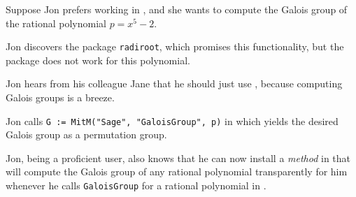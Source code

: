Suppose Jon prefers working in \GAP, and she wants to compute the
Galois group of the rational polynomial $p = x^5 - 2$.

Jon discovers the \GAP package \texttt{radiroot}, which promises this
functionality, but the package does not work for this polynomial.

Jon hears from his colleague Jane that he should just use \Sage, because
computing Galois groups is a breeze.


Jon calls \lstinline|G := MitM("Sage", "GaloisGroup", p)| in \GAP which yields
the desired Galois group as a \GAP permutation group.

Jon, being a proficient \GAP user, also knows that he can now install a \emph{method}
in \GAP that will compute the Galois group of any rational polynomial
transparently for him whenever he calls \lstinline|GaloisGroup| for a rational
polynomial in \GAP. 




